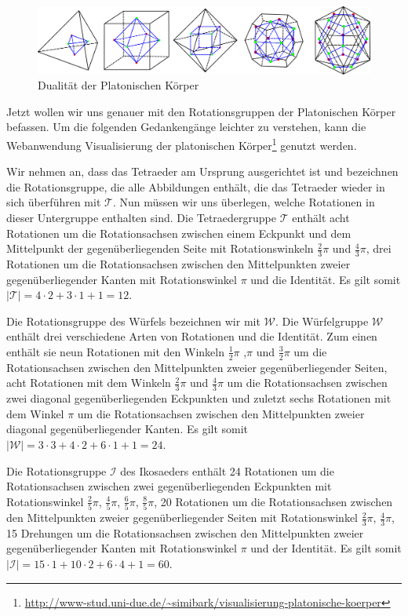 \begin{figure}[H]
\centering
\includegraphics[width=0.9\linewidth]{grafiken/dual_platonische_koerper.pdf}
\caption{Dualität der Platonischen Körper}
\label{fig:Dual_Platonische_Koerper}
\end{figure}

Jetzt wollen wir uns genauer mit den Rotationsgruppen der Platonischen Körper befassen. Um die folgenden Gedankengänge leichter zu verstehen, kann die Webanwendung Visualisierung der platonischen Körper\footnote{\url{http://www-stud.uni-due.de/~simibark/visualisierung-platonische-koerper}} genutzt werden.

Wir nehmen an, dass das Tetraeder am Ursprung ausgerichtet ist und bezeichnen die Rotationsgruppe, die alle Abbildungen enthält, die das Tetraeder wieder in sich überführen mit $\mathcal{T}$. Nun müssen wir uns überlegen, welche Rotationen in dieser Untergruppe enthalten sind. Die Tetraedergruppe $\mathcal{T}$ enthält acht Rotationen um die Rotationsachsen zwischen einem Eckpunkt und dem Mittelpunkt der gegenüberliegenden Seite mit Rotationswinkeln $\frac{2}{3}\pi$ und $\frac{4}{3}\pi$, drei Rotationen um die Rotationsachsen zwischen den Mittelpunkten zweier gegenüberliegender Kanten mit Rotationswinkel $\pi$ und die Identität. Es gilt somit $| \mathcal{T} | = 4 \cdot 2 + 3 \cdot 1 + 1 = 12$.

Die Rotationsgruppe des Würfels bezeichnen wir mit $\mathcal{W}$. Die Würfelgruppe $\mathcal{W}$ enthält drei verschiedene Arten von Rotationen und die Identität. Zum einen enthält sie neun Rotationen mit den Winkeln $\frac{1}{2}\pi$ ,$\pi$ und $\frac{3}{2}\pi$ um die Rotationsachsen zwischen den Mittelpunkten zweier gegenüberliegender Seiten, acht Rotationen mit dem Winkeln $\frac{2}{3}\pi$ und $\frac{4}{3}\pi$ um die Rotationsachsen zwischen zwei diagonal gegenüberliegenden Eckpunkten und zuletzt sechs Rotationen mit dem Winkel $\pi$ um die Rotationsachsen zwischen den Mittelpunkten zweier diagonal gegenüberliegender Kanten. Es gilt somit $| \mathcal{W} | = 3 \cdot 3 + 4 \cdot 2 + 6 \cdot 1 + 1 = 24$.

Die Rotationsgruppe $\mathcal{I}$ des Ikosaeders enthält 24 Rotationen um die Rotationsachsen zwischen zwei gegenüberliegenden Eckpunkten mit Rotationswinkel $\frac{2}{5}\pi$, $\frac{4}{5}\pi$, $\frac{6}{5}\pi$, $\frac{8}{5}\pi$, 20 Rotationen um die Rotationsachsen zwischen den Mittelpunkten zweier gegenüberliegender Seiten mit Rotationswinkel $\frac{2}{3}\pi$, $\frac{4}{3}\pi$, 15 Drehungen um die Rotationsachsen zwischen den Mittelpunkten zweier gegenüberliegender Kanten mit Rotationswinkel $\pi$ und der Identität. Es gilt somit $| \mathcal{I} | = 15 \cdot 1 + 10 \cdot 2 + 6 \cdot 4 + 1 = 60$.

